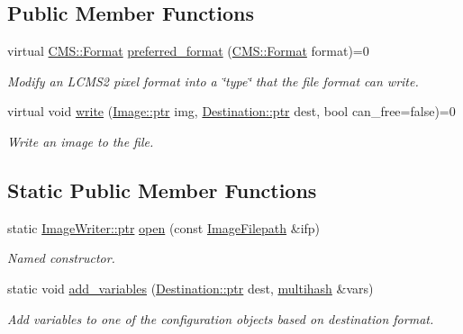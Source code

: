 \subsection*{Public Member Functions}
\begin{DoxyCompactItemize}
\item 
virtual \hyperlink{class_c_m_s_1_1_format}{C\+M\+S\+::\+Format} \hyperlink{class_photo_finish_1_1_image_writer_a83441e9a01ad47b3bb0e5efb1c751770}{preferred\+\_\+format} (\hyperlink{class_c_m_s_1_1_format}{C\+M\+S\+::\+Format} format)=0
\begin{DoxyCompactList}\small\item\em Modify an L\+C\+M\+S2 pixel format into a \char`\"{}type\char`\"{} that the file format can write. \end{DoxyCompactList}\item 
virtual void \hyperlink{class_photo_finish_1_1_image_writer_acb90040d3f1dfa166fbad32a9434ef38}{write} (\hyperlink{class_photo_finish_1_1_image_ab336203305ed3a1397d7245063353b5a}{Image\+::ptr} img, \hyperlink{class_photo_finish_1_1_destination_a0d282a905cd81c3f0e6d7233c9bc7774}{Destination\+::ptr} dest, bool can\+\_\+free=false)=0
\begin{DoxyCompactList}\small\item\em Write an image to the file. \end{DoxyCompactList}\end{DoxyCompactItemize}
\subsection*{Static Public Member Functions}
\begin{DoxyCompactItemize}
\item 
static \hyperlink{class_photo_finish_1_1_image_writer_ad09511cf9f26b7cec2ca0fb6ae361aac}{Image\+Writer\+::ptr} \hyperlink{class_photo_finish_1_1_image_writer_acc62967632f4e78f2c356842fbd3edb4}{open} (const \hyperlink{class_photo_finish_1_1_image_filepath}{Image\+Filepath} \&ifp)
\begin{DoxyCompactList}\small\item\em Named constructor. \end{DoxyCompactList}\item 
static void \hyperlink{class_photo_finish_1_1_image_writer_aabd983d34a04798323685e2514ff532d}{add\+\_\+variables} (\hyperlink{class_photo_finish_1_1_destination_a0d282a905cd81c3f0e6d7233c9bc7774}{Destination\+::ptr} dest, \hyperlink{namespace_photo_finish_a6f41796f162687538b7da5c7a95e2d18}{multihash} \&vars)
\begin{DoxyCompactList}\small\item\em Add variables to one of the configuration objects based on destination format. \end{DoxyCompactList}\end{DoxyCompactItemize}
